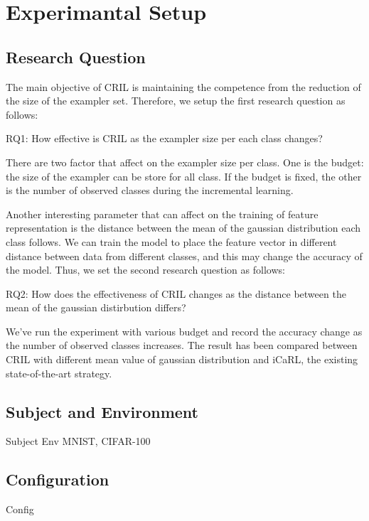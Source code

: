 \section{Experimantal Setup}
\label{sec:setup}

\subsection{Research Question}
\label{sec:rq}

The main objective of CRIL is maintaining the competence from the reduction of the size of the exampler set. Therefore, we setup the first research question as follows:

\begin{framed}
\textsc{RQ1}: How effective is CRIL as the exampler size per each class changes?
\label{rq1}
\end{framed}

There are two factor that affect on the exampler size per class. One is the budget: the size of the exampler can be store for all class. If the budget is fixed, the other is the number of observed classes during the incremental learning.

Another interesting parameter that can affect on the training of feature representation is the distance between the mean of the gaussian distribution each class follows. We can train the model to place the feature vector in different distance between data from different classes, and this may change the accuracy of the model. Thus, we set the second research question as follows:

\begin{framed}
\textsc{RQ2}: How does the effectiveness of CRIL changes as the distance between the mean of the gaussian distirbution differs?
\label{rq2}
\end{framed}

We've run the experiment with various budget and record the accuracy change as the number of observed classes increases. The result has been compared between CRIL with different mean value of gaussian distribution and iCaRL, the existing state-of-the-art strategy.

\subsection{Subject and Environment}
\label{sec:subject}

Subject
Env
MNIST, CIFAR-100

\subsection{Configuration}
\label{sec:configuration}


Config
